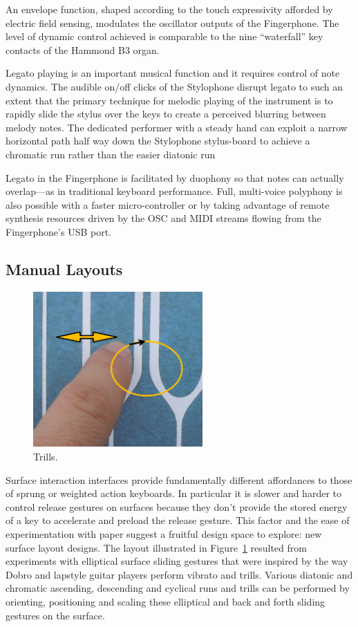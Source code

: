 An envelope function, shaped according to the touch expressivity afforded by
electric field sensing, modulates the oscillator outputs of the Fingerphone. The
level of dynamic control achieved is comparable to the nine ``waterfall'' key
contacts of the Hammond B3 organ.

Legato playing is an important musical function and it requires
control of note dynamics. The audible on/off clicks of the Stylophone disrupt
legato to such an extent that the primary technique for melodic playing of the
instrument is to rapidly slide the stylus over the keys to create a perceived
blurring between melody notes. The dedicated performer with a steady hand can
exploit a narrow horizontal path half way down the Stylophone stylus-board to
achieve a chromatic run rather than the easier diatonic run

Legato in the Fingerphone is facilitated by duophony so that notes
can actually overlap---as in traditional keyboard performance. Full, multi-voice
polyphony is also possible with a faster micro-controller or by taking advantage
of remote synthesis resources driven by the OSC and MIDI streams flowing from the
Fingerphone's USB port.

\subsection{Manual Layouts}


\begin{figure}[t]
\centering
\includegraphics[width=184pt]{fig8}
\caption{Trills.}
\label{Freed:img-8}
\end{figure}



Surface interaction interfaces provide fundamentally different affordances to
those of sprung or weighted action keyboards. In particular it is slower and
harder to control release gestures on surfaces because they don't provide the
stored energy of a key to accelerate and preload the release gesture. This factor
and the ease of experimentation with paper suggest a fruitful design space to
explore: new surface layout designs. The layout illustrated in Figure~\ref{Freed:img-8} resulted
from experiments with elliptical surface sliding gestures that were inspired by
the way Dobro and lapstyle guitar players perform vibrato and trills. Various
diatonic and chromatic ascending, descending and cyclical runs and trills can be
performed by orienting, positioning and scaling these elliptical and back and
forth sliding gestures on the surface.

